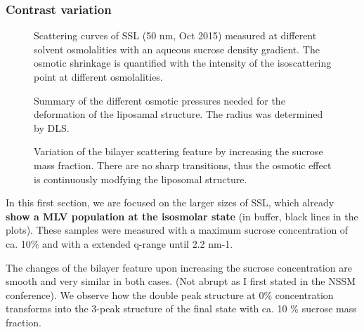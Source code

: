 \subsubsection{Contrast variation}

\begin{figure}
	\centering
		\caption{Scattering curves of SSL (50 nm, Oct 2015) measured at different solvent osmolalities with an aqueous sucrose density gradient. The osmotic shrinkage is quantified with the intensity of the isoscattering point at different osmolalities.}
\end{figure}

\begin{figure}
	\centering
		\subfloat[SSL 200 nm]{\resizebox{0.44\linewidth}{!}{}\label{fig:SSLContrastCurvesBilayer200SSL}}
		\subfloat[Plain 100 nm]{\resizebox{0.44\linewidth}{!}{}\label{fig:SSLContrastCurvesBilayer100Plain}}
		\caption{Summary of the different osmotic pressures needed for the deformation of the liposamal structure. The radius was determined by DLS.}
\end{figure}

\begin{figure}
	\centering
		
		\caption{Variation of the bilayer scattering feature by increasing the sucrose mass fraction. There are no sharp transitions, thus the osmotic effect is continuously modfying the liposomal structure.}
		\label{fig:SSLContrastVariationChiSquared400SSL}
\end{figure}

In this first section, we are focused on the larger sizes of SSL, which already \textbf{show a MLV population at the isosmolar state} (in buffer, black lines in the plots). These samples were measured with a maximum sucrose concentration of ca. 10$\%$ and with a extended q-range until 2.2 nm-1.

The changes of the bilayer feature upon increasing the sucrose concentration are smooth and very similar in both cases. (Not abrupt as I first stated in the NSSM conference). We observe how the double peak structure at 0$\%$ concentration transforms into the 3-peak structure of the final state with ca. 10 $\%$ sucrose mass fraction.

